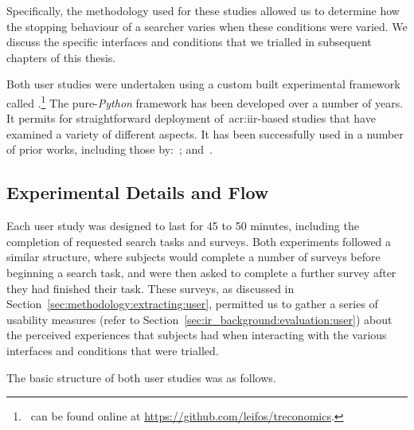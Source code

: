 Specifically, the methodology used for these studies allowed us to determine how the stopping behaviour of a searcher varies when these conditions were varied. We discuss the specific interfaces and conditions that we trialled in subsequent chapters of this thesis.

Both user studies were undertaken using a custom built experimental framework called .\footnote{\treconomics~can be found online at \url{https://github.com/leifos/treconomics}. } The pure-\emph{Python} framework has been developed over a number of years. It permits for straightforward deployment of~\gls{acr:iir}-based studies that have examined a variety of different aspects. It has been successfully used in a number of prior works, including those by:~\cite{azzopardi2013query_cost, maxwell2014temporal_delays, kelly2015serp_size, edwards2015query_interface}; and~\cite{crescenzi2016time_constraints}.


\subsection{Experimental Details and Flow}\label{sec:methodology:user:flow}
Each user study was designed to last for 45 to 50 minutes, including the completion of requested search tasks and surveys. Both experiments followed a similar structure, where subjects would complete a number of surveys before beginning a search task, and were then asked to complete a further survey after they had finished their task. These surveys, as discussed in Section~\ref{sec:methodology:extracting:user}, permitted us to gather a series of usability measures (refer to Section~\ref{sec:ir_background:evaluation:user}) about the perceived experiences that subjects had when interacting with the various interfaces and conditions that were trialled.

The basic structure of both user studies was as follows.

